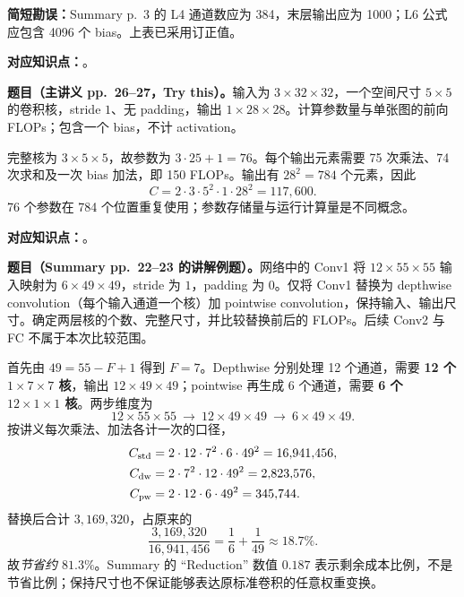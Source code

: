 \textbf{简短勘误：}Summary p.~3 的 L4 通道数应为 384，末层输出应为 1000；L6 公式应包含 4096 个 bias。上表已采用订正值。


\textbf{对应知识点：}。

\textbf{题目（主讲义 pp.~26--27，Try this）。}输入为 $3\times32\times32$，一个空间尺寸 $5\times5$ 的卷积核，stride $1$、无 padding，输出 $1\times28\times28$。计算参数量与单张图的前向 FLOPs；包含一个 bias，不计 activation。

\begin{workedsolution}
完整核为 $3\times5\times5$，故参数为 $3\cdot25+1=76$。每个输出元素需要 75 次乘法、74 次求和及一次 bias 加法，即 150 FLOPs。输出有 $28^2=784$ 个元素，因此
\[
 C=2\cdot3\cdot5^2\cdot1\cdot28^2=\boxed{117{,}600}.
\]
76 个参数在 784 个位置重复使用；参数存储量与运行计算量是不同概念。
\end{workedsolution}


\textbf{对应知识点：}。

\textbf{题目（Summary pp.~22--23 的讲解例题）。}网络中的 Conv1 将 $12\times55\times55$ 输入映射为 $6\times49\times49$，stride 为 $1$，padding 为 $0$。仅将 Conv1 替换为 depthwise convolution（每个输入通道一个核）加 pointwise convolution，保持输入、输出尺寸。确定两层核的个数、完整尺寸，并比较替换前后的 FLOPs。后续 Conv2 与 FC 不属于本次比较范围。

\begin{workedsolution}
首先由 $49=55-F+1$ 得到 $F=7$。Depthwise 分别处理 12 个通道，需要 \textbf{12 个 $1\times7\times7$ 核}，输出 $12\times49\times49$；pointwise 再生成 6 个通道，需要 \textbf{6 个 $12\times1\times1$ 核}。两步维度为
\[
 12\times55\times55\ \longrightarrow\ 12\times49\times49
 \ \longrightarrow\ 6\times49\times49.
\]
按讲义每次乘法、加法各计一次的口径，
\[
\begin{aligned}
 C_{\rm std}&=2\cdot12\cdot7^2\cdot6\cdot49^2=16{,}941{,}456,\\
 C_{\rm dw}&=2\cdot7^2\cdot12\cdot49^2=2{,}823{,}576,\\
 C_{\rm pw}&=2\cdot12\cdot6\cdot49^2=345{,}744.
\end{aligned}
\]
替换后合计 $3{,}169{,}320$，占原来的
\[
 \frac{3{,}169{,}320}{16{,}941{,}456}
 =\frac16+\frac1{49}\approx\boxed{18.7\%}.
\]
故\emph{节省约 $81.3\%$}。Summary 的 ``Reduction'' 数值 $0.187$ 表示剩余成本比例，不是节省比例；保持尺寸也不保证能够表达原标准卷积的任意权重变换。
\end{workedsolution}

